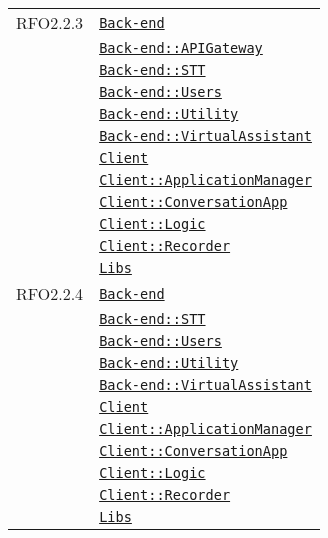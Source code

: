 \begin{longtable}{|>{\centering}m{3cm}|m{10cm}<{\centering}|}
RFO2.2.3 & \hyperref[Back-end]{\texttt{Back-end}}\\
& \hyperref[Back-end::APIGateway]{\texttt{Back-end::APIGateway}}\\
& \hyperref[Back-end::STT]{\texttt{Back-end::STT}}\\
& \hyperref[Back-end::Users]{\texttt{Back-end::Users}}\\
& \hyperref[Back-end::Utility]{\texttt{Back-end::Utility}}\\
& \hyperref[Back-end::VirtualAssistant]{\texttt{Back-end::VirtualAssistant}}\\
& \hyperref[Client]{\texttt{Client}}\\
& \hyperref[Client::ApplicationManager]{\texttt{Client::ApplicationManager}}\\
& \hyperref[Client::ConversationApp]{\texttt{Client::ConversationApp}}\\
& \hyperref[Client::Logic]{\texttt{Client::Logic}}\\
& \hyperref[Client::Recorder]{\texttt{Client::Recorder}}\\
& \hyperref[Libs]{\texttt{Libs}}\\ \hline

RFO2.2.4 & \hyperref[Back-end]{\texttt{Back-end}}\\
& \hyperref[Back-end::STT]{\texttt{Back-end::STT}}\\
& \hyperref[Back-end::Users]{\texttt{Back-end::Users}}\\
& \hyperref[Back-end::Utility]{\texttt{Back-end::Utility}}\\
& \hyperref[Back-end::VirtualAssistant]{\texttt{Back-end::VirtualAssistant}}\\
& \hyperref[Client]{\texttt{Client}}\\
& \hyperref[Client::ApplicationManager]{\texttt{Client::ApplicationManager}}\\
& \hyperref[Client::ConversationApp]{\texttt{Client::ConversationApp}}\\
& \hyperref[Client::Logic]{\texttt{Client::Logic}}\\
& \hyperref[Client::Recorder]{\texttt{Client::Recorder}}\\
& \hyperref[Libs]{\texttt{Libs}}\\ \hline


\end{longtable}
